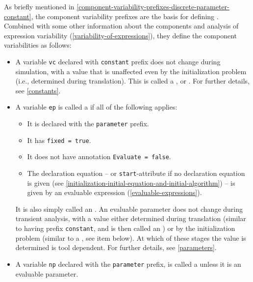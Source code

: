 As briefly mentioned in \cref{component-variability-prefixes-discrete-parameter-constant}, the component variability prefixes are the basis for defining .
Combined with some other information about the components and analysis of expression variability (\cref{variability-of-expressions}), they define the component variabilities as follows:
\begin{itemize}
\item
  A variable \lstinline!vc! declared with \lstinline!constant! prefix does not change during simulation, with a value that is unaffected even by the initialization problem (i.e., determined during translation).
  This is called a , or .
  For further details, see \ref{constants}.
\item
  A variable \lstinline!ep! is called a  if all of the following applies:
  \begin{itemize}
  \item
    It is declared with the \lstinline!parameter! prefix.
  \item
    It has \lstinline!fixed = true!.
  \item
    It does not have annotation \lstinline!Evaluate = false!.
  \item
    The declaration equation -- or \lstinline!start!-attribute if no declaration equation is given (see \cref{initialization-initial-equation-and-initial-algorithm}) -- is given by an evaluable expression (\cref{evaluable-expressions}).
  \end{itemize}
  It is also simply called an .
  An evaluable parameter does not change during transient analysis, with a value either determined during translation (similar to having prefix \lstinline!constant!, and is then called an ) or by the initialization problem (similar to a , see item below).
  At which of these stages the value is determined is tool dependent.
  For further details, see \ref{parameters}.
\item
  A variable \lstinline!np! declared with the \lstinline!parameter! prefix, is called a  unless it is an evaluable parameter.

\end{itemize}
